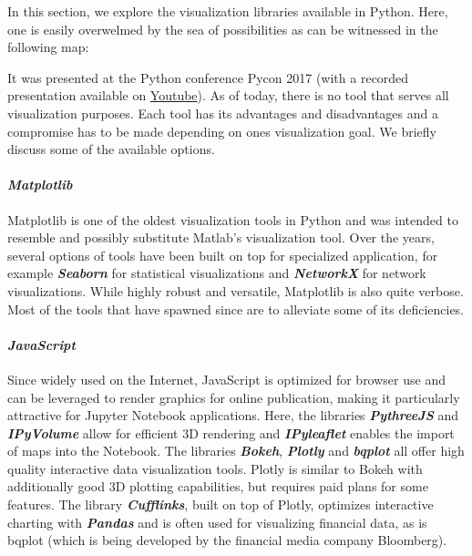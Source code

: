 \documentclass[11pt]{article}
\begin{document}
In this section, we explore the visualization libraries available in
Python. Here, one is easily overwelmed by the sea of possibilities as
can be witnessed in the following map:

    

    It was presented at the Python conference Pycon 2017 (with a recorded
presentation available on
\href{https://www.youtube.com/watch?v=TPl9bMg8j8U}{Youtube}). As of
today, there is no tool that serves all visualization purposes. Each
tool has its advantages and disadvantages and a compromise has to be
made depending on ones visualization goal. We briefly discuss some of
the available options.

\paragraph{\texorpdfstring{\emph{Matplotlib}}{Matplotlib}}\label{matplotlib}

Matplotlib is one of the oldest visualization tools in Python and was
intended to resemble and possibly substitute Matlab's visualization
tool. Over the years, several options of tools have been built on top
for specialized application, for example \textbf{\emph{Seaborn}} for
statistical visualizations and \textbf{\emph{NetworkX}} for network
visualizations. While highly robust and versatile, Matplotlib is also
quite verbose. Most of the tools that have spawned since are to
alleviate some of its deficiencies.

\paragraph{\texorpdfstring{\emph{JavaScript}}{JavaScript}}\label{javascript}

Since widely used on the Internet, JavaScript is optimized for browser
use and can be leveraged to render graphics for online publication,
making it particularly attractive for Jupyter Notebook applications.
Here, the libraries \textbf{\emph{PythreeJS}} and
\textbf{\emph{IPyVolume}} allow for efficient 3D rendering and
\textbf{\emph{IPyleaflet}} enables the import of maps into the Notebook.
The libraries \textbf{\emph{Bokeh}}, \textbf{\emph{Plotly}} and
\textbf{\emph{bqplot}} all offer high quality interactive data
visualization tools. Plotly is similar to Bokeh with additionally good
3D plotting capabilities, but requires paid plans for some features. The
library \textbf{\emph{Cufflinks}}, built on top of Plotly, optimizes
interactive charting with \textbf{\emph{Pandas}} and is often used for
visualizing financial data, as is bqplot (which is being developed by
the financial media company Bloomberg).
\end{document}
